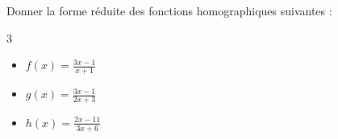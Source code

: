 \begin{Application}
Donner la forme réduite des fonctions homographiques suivantes :
\begin{multicols}{3}
    \begin{itemize}
    \item $f(x) = \frac{3x-1}{x+1}$ 
    \item $g(x) = \frac{3x-1}{2x+3}$
    \item $h(x) = \frac{2x-11}{3x+6}$
\end{itemize}
\end{multicols}
\end{Application}
